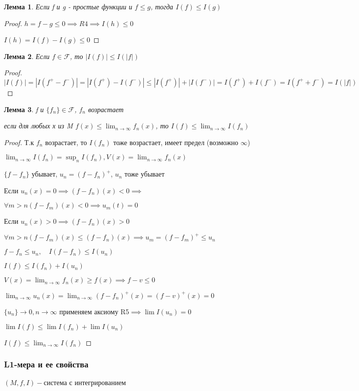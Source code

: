 \documentclass[a4paper, 12pt]{article}
\newtheorem{lemma}{Лемма}[section]
\theoremstyle{definition}
\theoremstyle{remark}
\begin{document}
\begin{lemma}
     Если f и g - простые функции и $f\leq g$, тогда $I(f)\leq I(g)$
\end{lemma}
\begin{proof}
     $h = f-g\leq 0 \implies R4 \implies I(h)\leq 0$

     $I(h) = I(f) - I(g)\leq 0$
\end{proof}
\begin{lemma}
     Если $f\in \mathcal{F} $, то $|I(f)|\leq I(|f|)$
\end{lemma}
\begin{proof}
     $|I(f)| = |I(f^+ - f^-)| = |I(f^+) - I(f^-)|\leq|I(f^+)| + |I(f^-)| = I(f^+) + I(f^-) = I(f^+ + f^-) = I(|f|)$
\end{proof}
\begin{lemma}
     f и $\{f_n\}\in \mathcal{F} $, $f_n$ возрастает

     если для любых х из M $f(x)\leq \lim_{n\to\infty}f_n(x)$, то $I(f)\leq \lim_{n\to\infty}I(f_n)$
\end{lemma}
\begin{proof}
     Т.к $f_n$ возрастает, то $I(f_n)$ тоже возрастает, имеет предел (возможно $\infty$)

     $\lim_{n\to\infty}I(f_n)=\sup_{n}I(f_n), V(x) = \lim_{n\to\infty}f_n(x)$

     $\{f-f_n\}$ убывает, $u_n = (f-f_n)^+$, $u_n$ тоже убывает

     Если $u_n(x)=0\implies (f-f_n)(x)<0\implies$

     $\forall m>n (f-f_m)(x)< 0\implies u_m(t) = 0$

     Если $u_n(x)>0\implies (f-f_n)(x)>0$

     $\forall m > n (f-f_m)(x)\leq (f-f_n)(x)\implies u_m = (f-f_m)^+\leq u_n$

     $f - f_n\leq u_n, \quad I(f-f_n)\leq I(u_n)$

     $I(f)\leq I(f_n)+I(u_n)$

     $V(x) = \lim_{n\to\infty}f_n(x)\geq f(x)\implies f-v\leq 0$

     $\lim_{n\to\infty}u_n(x) = \lim_{n\to\infty}(f-f_n)^+(x) = (f - v)^+(x) = 0$

     $\{u_n\}\to 0, n\to \infty$ применяем аксиому R5$\implies\lim I(u_n) = 0$

     $\lim I(f)\leq \lim I(f_n) + \lim I(u_n)$

     $I(f)\leq \lim_{n\to\infty}I(f_n)$
\end{proof}
\subsubsection{L1-мера и ее свойства}
$(M, f, I) - $система с интегрированием
\end{document}
